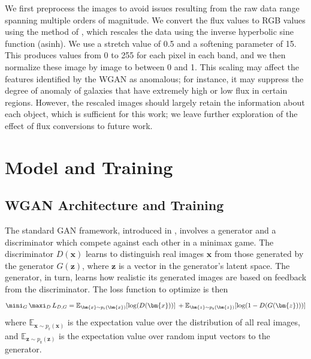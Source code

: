 We first preprocess the images to avoid issues resulting from the raw data range spanning multiple orders of magnitude.
We convert the flux values to RGB values using the method of \citealt{Lupton2004}, which rescales the data using the inverse hyperbolic sine function (asinh).
We use a stretch value of 0.5 and a softening parameter of 15.
This produces values from 0 to 255 for each pixel in each band, and we then normalize these image by image to between 0 and 1.
This scaling may affect the features identified by the WGAN as anomalous; for instance, it may suppress the degree of anomaly of galaxies that have extremely high or low flux in certain regions.
However, the rescaled images should largely retain the information about each object, which is sufficient for this work; we leave further exploration of the effect of flux conversions to future work.

\section{Model and Training}
\label{sec:model}

\subsection{WGAN Architecture and Training}

The standard GAN framework, introduced in \cite{Goodfellow2014}, involves a generator and a discriminator which compete against each other in a minimax game.
The discriminator $D(\bm{x})$ learns to distinguish real images $\bm{x}$ from those generated by the generator $G(\bm{z})$, where $\bm{z}$ is a vector in the generator's latent space.
The generator, in turn, learns how realistic its generated images are based on feedback from the discriminator.
The loss function to optimize is then
\begin{multline}
\mini_G \, \maxi_D \, L_{D,G} = \mathbb{E}_{\bm{x}\sim p_{\mathrm{r}}(\bm{x})}[\mathrm{log} (D(\bm{x}))] \: + \mathbb{E}_{\bm{z}\sim p_{\mathrm{z}}(\bm{z})}[\mathrm{log}(1 - D(G(\bm{z})))] 
\end{multline}
where $\mathbb{E}_{\bm{x}\sim p_{\mathrm{r}}(\bm{x})}$ is the expectation value over the distribution of all real images, and $\mathbb{E}_{\bm{z}\sim p_{\mathrm{z}}(\bm{z})}$ is the expectation value over random input vectors to the generator.


